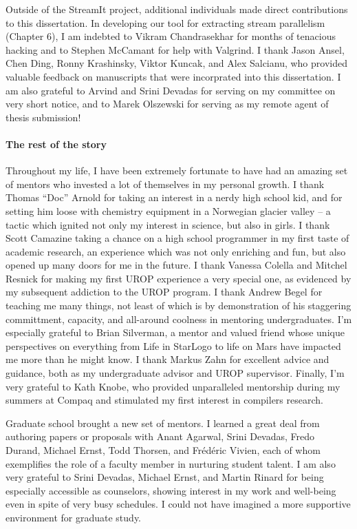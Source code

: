 Outside of the StreamIt project, additional individuals made direct
contributions to this dissertation.  In developing our tool for
extracting stream parallelism (Chapter 6), I am indebted to Vikram
Chandrasekhar for months of tenacious hacking and to Stephen McCamant
for help with Valgrind.  I thank Jason Ansel, Chen Ding, Ronny
Krashinsky, Viktor Kuncak, and Alex Salcianu, who provided valuable
feedback on manuscripts that were incorprated into this dissertation.
I am also grateful to Arvind and Srini Devadas for serving on my
committee on very short notice, and to Marek Olszewski for serving as
my remote agent of thesis submission!

\vspace{-8pt}\paragraph*{The rest of the story} Throughout my life,
I have been extremely fortunate to have had an amazing set of
mentors who invested a lot of themselves in my personal growth.  I
thank Thomas ``Doc'' Arnold for taking an interest in a nerdy high
school kid, and for setting him loose with chemistry equipment in a
Norwegian glacier valley -- a tactic which ignited not only my
interest in science, but also in girls.  I thank Scott Camazine
taking a chance on a high school programmer in my first taste of
academic research, an experience which was not only enriching and
fun, but also opened up many doors for me in the future.  I thank
Vanessa Colella and Mitchel Resnick for making my first UROP
experience a very special one, as evidenced by my subsequent
addiction to the UROP program.  I thank Andrew Begel for teaching me
many things, not least of which is by demonstration of his
staggering committment, capacity, and all-around coolness in
mentoring undergraduates.  I'm especially grateful to Brian
Silverman, a mentor and valued friend whose unique perspectives on
everything from Life in StarLogo to life on Mars have impacted me
more than he might know.  I thank Markus Zahn for excellent advice
and guidance, both as my undergraduate advisor and UROP supervisor.
Finally, I'm very grateful to Kath Knobe, who provided unparalleled
mentorship during my summers at Compaq and stimulated my first
interest in compilers research.

Graduate school brought a new set of mentors.  I learned a great
deal from authoring papers or proposals with Anant Agarwal, Srini
Devadas, Fredo Durand, Michael Ernst, Todd Thorsen, and
Fr\'{e}d\'{e}ric Vivien, each of whom exemplifies the role of a
faculty member in nurturing student talent.  I am also very grateful
to Srini Devadas, Michael Ernst, and Martin Rinard for being
especially accessible as counselors, showing interest in my work and
well-being even in spite of very busy schedules.  I could not have
imagined a more supportive environment for graduate study.

